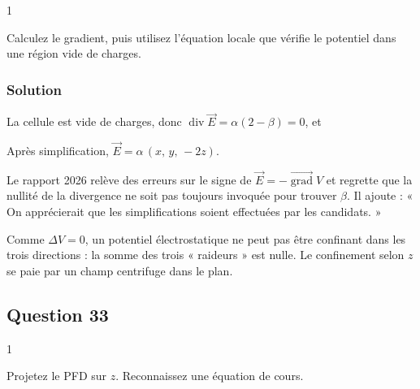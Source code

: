 \documentclass[11pt,a4paper]{article}
\newcommand{\equationajustee}[1]{%
  \sbox{\boiteequation}{$\displaystyle #1$}%
  \ifdim\wd\boiteequation>\linewidth
    \[\resizebox{\linewidth}{!}{\usebox{\boiteequation}}\]%
  \else
    \[#1\]%
  \fi}
\begin{document}
\begin{indication}{1}

Calculez le gradient, puis utilisez l'équation locale que vérifie le potentiel dans une région vide de charges.

\end{indication}

\hypertarget{solution-31}{%
\subsubsection{Solution}\label{solution-31}}

\equationajustee{\boxed{\begin{aligned}
E_x&=\alpha x\\
E_y&=\alpha y\\
E_z&=-\alpha\beta z
\end{aligned}}}

La cellule est vide de charges, donc \(\operatorname{div}\vec E=\alpha(2-\beta)=0\), et

\equationajustee{\boxed{\beta=2}}

Après simplification, \(\vec E=\alpha\,(x,\,y,\,-2z)\).

\begin{jury}

Le rapport 2026 relève des erreurs sur le signe de \(\vec E=-\overrightarrow{\operatorname{grad}}V\) et regrette que la nullité de la divergence ne soit pas toujours invoquée pour trouver \(\beta\). Il ajoute : « On apprécierait que les simplifications soient effectuées par les candidats. »

\end{jury}

\begin{methode}

Comme \(\Delta V=0\), un potentiel électrostatique ne peut pas être confinant dans les trois directions : la somme des trois « raideurs » est nulle. Le confinement selon \(z\) se paie par un champ centrifuge dans le plan.

\end{methode}

\hypertarget{question-33}{%
\subsection{Question 33}\label{question-33}}

\begin{indication}{1}

Projetez le PFD sur \(z\). Reconnaissez une équation de cours.

\end{indication}
\end{document}
